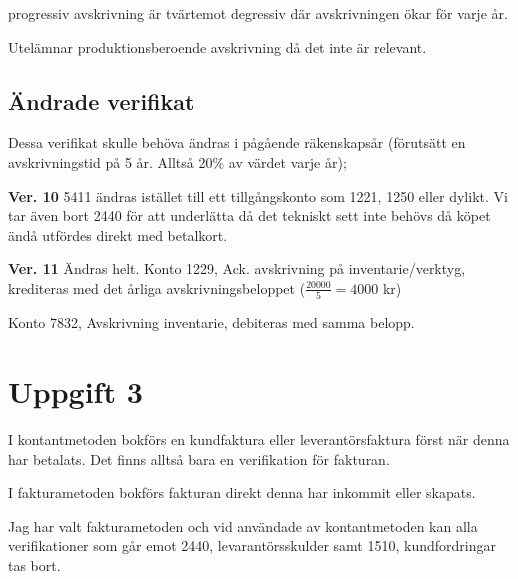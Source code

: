\documentclass[12pt]{article}
\begin{document}
progressiv avskrivning är tvärtemot degressiv där avskrivningen ökar för varje år.

\bigskip

Utelämnar produktionsberoende avskrivning då det inte är relevant.

\subsection*{Ändrade verifikat}
Dessa verifikat skulle behöva ändras i pågående räkenskapsår (förutsätt en avskrivningstid på 5 år. Alltså 20\% av värdet varje år);

\textbf{Ver. 10} 5411 ändras istället till ett tillgångskonto som 1221, 1250 eller dylikt. Vi tar även bort 2440 för att underlätta då det tekniskt sett inte behövs då köpet ändå utfördes direkt med betalkort.

\textbf{Ver. 11} Ändras helt. Konto 1229, Ack. avskrivning på inventarie/verktyg, krediteras med det årliga avskrivningsbeloppet ($\frac{20000}{5}= 4000$ kr)

Konto 7832, Avskrivning inventarie, debiteras med samma belopp.


\section*{Uppgift 3}
I kontantmetoden bokförs en kundfaktura eller leverantörsfaktura först när denna har betalats. Det finns alltså bara en verifikation för fakturan.

I fakturametoden bokförs fakturan direkt denna har inkommit eller skapats.

Jag har valt fakturametoden och vid användade av kontantmetoden kan alla verifikationer som går emot 2440, levarantörsskulder samt 1510, kundfordringar tas bort.
\end{document}
